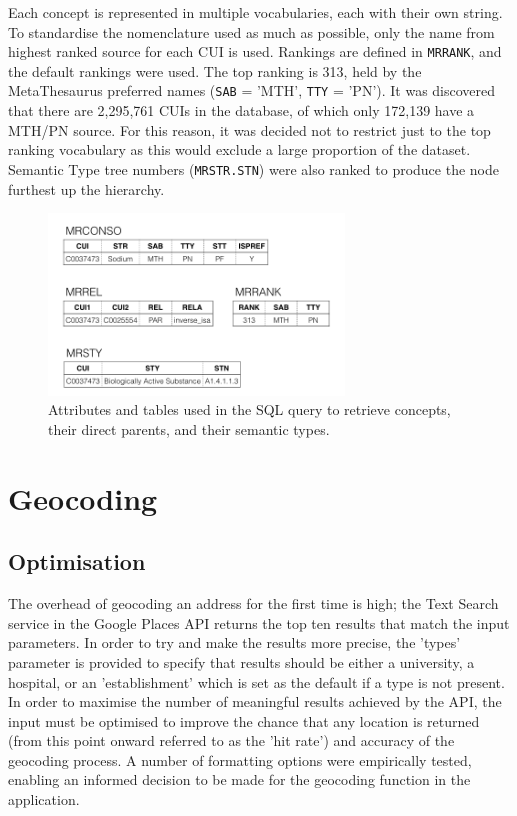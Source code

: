 \documentclass[Report.tex]{subfiles}
\begin{document}
\noindent Each concept is represented in multiple vocabularies, each with their own string. To standardise the nomenclature used as much as possible, only the name from highest ranked source for each CUI is used. Rankings are defined in \texttt{MRRANK}, and the default rankings were used. The top ranking is 313, held by the MetaThesaurus preferred names (\texttt{SAB} = 'MTH', \texttt{TTY} = 'PN'). It was discovered that there are 2,295,761 CUIs in the database, of which only 172,139 have a MTH/PN source. For this reason, it was decided not to restrict just to the top ranking vocabulary as this would exclude a large proportion of the dataset. Semantic Type tree numbers (\texttt{MRSTR.STN}) were also ranked to produce the node furthest up the hierarchy.

\begin{figure}[h!]
\begin{center}
\includegraphics[width=0.7\textwidth]{../lib/images/db.png}
\caption{Attributes and tables used in the SQL query to retrieve concepts, their direct parents, and their semantic types.}
\label{fig:db}
\end{center}
\end{figure}

\section{Geocoding}
\subsection{Optimisation}
The overhead of geocoding an address for the first time is high; the Text Search service in the Google Places API returns the top ten results that match the input parameters. In order to try and make the results more precise, the 'types' parameter is provided to specify that results should be either a university, a hospital, or an 'establishment' which is set as the default if a type is not present. In order to maximise the number of meaningful results achieved by the API, the input must be optimised to improve the chance that any location is returned (from this point onward referred to as the 'hit rate') and accuracy of the geocoding process. A number of formatting options were empirically tested, enabling an informed decision to be made for the geocoding function in the application.\newline
\end{document}
